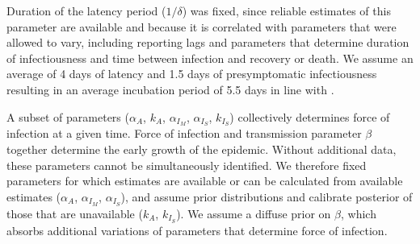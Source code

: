 \documentclass[11pt]{article}
\begin{document}
Duration of the latency period ($1/\delta$) was fixed, since reliable estimates of this parameter are available and because it is correlated with parameters that were allowed to vary, including reporting lags and parameters that determine duration of infectiousness and time between infection and recovery or death. We assume an average of 4 days of latency \citep{li2020substantial, salje2020estimating} and 1.5 days of presymptomatic infectiousness \citep{wei2020presymptomatic} resulting in an average incubation period of 5.5 days in line with \citep{lauer2020incubation, bi2020epidemiology, li2020early, linton2020incubation, he2020estimation, salje2020estimating}. 

A subset of parameters ($\alpha_A$, $k_A$, $\alpha_{I_M}$, $\alpha_{I_S}$, $k_{I_S}$) collectively determines force of infection at a given time. Force of infection and transmission parameter $\beta$ together
determine the early growth of the epidemic. Without additional data, these parameters cannot be simultaneously identified. We therefore fixed parameters for which estimates are available or can be calculated from available estimates ($\alpha_A$, $\alpha_{I_M}$, $\alpha_{I_S}$), and assume prior distributions and calibrate posterior of those that are unavailable ($k_A$, $k_{I_S}$). We assume a diffuse prior on $\beta$, which absorbs additional variations of parameters that determine force of infection. 
\end{document}
